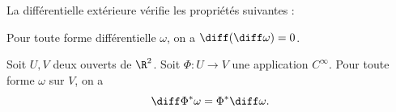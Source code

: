 \begin{fprop} La différentielle extérieure vérifie les propriétés suivantes :
\begin{MYenumerate}
\item Pour toute forme différentielle $\omega$, on a $\diff (\diff \omega) = 0$.

\item Soit $U, V$ deux ouverts de $\R^2$. Soit $\Phi \colon U \to V$ une application  $C^\infty$. Pour toute forme $\omega$ sur $V$, on a
\[\diff \Phi^\ast \omega= \Phi^\ast \diff \omega.\]
\end{MYenumerate}
\end{fprop}
